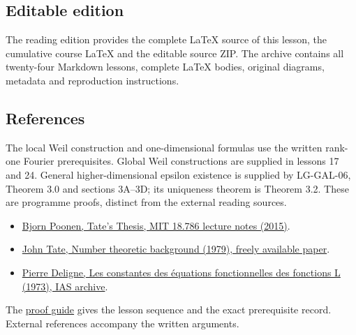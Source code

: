 \documentclass[11pt,a4paper]{article}
\newcommand{\tightlist}{\setlength{\itemsep}{0pt}\setlength{\parskip}{0pt}}
\begin{document}
\subsection{Editable edition}\label{editable-edition}

The reading edition provides the complete LaTeX source of this lesson,
the cumulative course LaTeX and the editable source ZIP. The archive
contains all twenty-four Markdown lessons, complete LaTeX bodies,
original diagrams, metadata and reproduction instructions.

\subsection{References}\label{references}

The local Weil construction and one-dimensional formulas use the written
rank-one Fourier prerequisites. Global Weil constructions are supplied
in lessons 17 and 24. General higher-dimensional epsilon existence is supplied by LG-GAL-06, Theorem 3.0 and sections 3A–3D; its uniqueness theorem is Theorem 3.2. These are programme proofs, distinct from the external reading sources.

\begin{itemize}
\tightlist
\item
  \href{https://math.mit.edu/~poonen/786/notes.pdf}{Bjorn Poonen, Tate's
  Thesis, MIT 18.786 lecture notes (2015)}.
\item
  \href{https://ncatlab.org/nlab/files/TateNumberTheory.pdf}{John Tate,
  Number theoretic background (1979), freely available paper}.
\item
  \href{https://publications.ias.edu/sites/default/files/Number20.pdf}{Pierre
  Deligne, Les constantes des équations fonctionnelles des fonctions L
  (1973), IAS archive}.
\end{itemize}

The \href{../free-proofs.html}{proof guide} gives the lesson sequence
and the exact prerequisite record. External references accompany the
written arguments.
\end{document}
